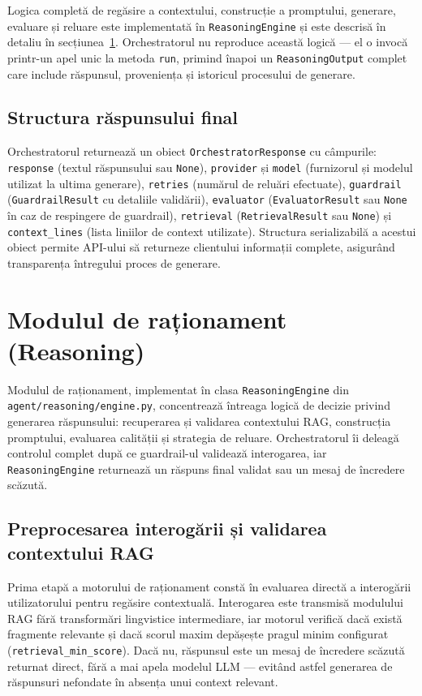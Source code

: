 \documentclass[12pt, a4paper, oneside, romanian]{teza-upb}
\begin{document}
Logica completă de regăsire a contextului, construcție a promptului, generare, evaluare și reluare este implementată în \texttt{ReasoningEngine} și este descrisă în detaliu în secțiunea~\ref{sec:reasoning}. Orchestratorul nu reproduce această logică — el o invocă printr-un apel unic la metoda \texttt{run}, primind înapoi un \texttt{ReasoningOutput} complet care include răspunsul, proveniența și istoricul procesului de generare.

\subsection{Structura răspunsului final}

Orchestratorul returnează un obiect \texttt{OrchestratorResponse} cu câmpurile: \texttt{response} (textul răspunsului sau \texttt{None}), \texttt{provider} și \texttt{model} (furnizorul și modelul utilizat la ultima generare), \texttt{retries} (numărul de reluări efectuate), \texttt{guardrail} (\texttt{GuardrailResult} cu detaliile validării), \texttt{evaluator} (\texttt{EvaluatorResult} sau \texttt{None} în caz de respingere de guardrail), \texttt{retrieval} (\texttt{RetrievalResult} sau \texttt{None}) și \texttt{context\_lines} (lista liniilor de context utilizate). Structura serializabilă a acestui obiect permite API-ului să returneze clientului informații complete, asigurând transparența întregului proces de generare.


\section{Modulul de raționament (Reasoning)}
\label{sec:reasoning}

Modulul de raționament, implementat în clasa \texttt{ReasoningEngine} din \texttt{agent/reasoning/engine.py}, concentrează întreaga logică de decizie privind generarea răspunsului: recuperarea și validarea contextului RAG, construcția promptului, evaluarea calității și strategia de reluare. Orchestratorul îi deleagă controlul complet după ce guardrail-ul validează interogarea, iar \texttt{ReasoningEngine} returnează un răspuns final validat sau un mesaj de încredere scăzută.

\subsection{Preprocesarea interogării și validarea contextului RAG}

Prima etapă a motorului de raționament constă în evaluarea directă a interogării utilizatorului pentru regăsire contextuală. Interogarea este transmisă modulului RAG fără transformări lingvistice intermediare, iar motorul verifică dacă există fragmente relevante și dacă scorul maxim depășește pragul minim configurat (\texttt{retrieval\_min\_score}). Dacă nu, răspunsul este un mesaj de încredere scăzută returnat direct, fără a mai apela modelul LLM — evitând astfel generarea de răspunsuri nefondate în absența unui context relevant.
\end{document}
